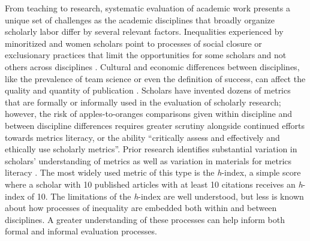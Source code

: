 \documentclass[
  10pt,
  letterpaper,
]{article}
\begin{document}
From teaching to research, systematic evaluation of academic work
presents a unique set of challenges as the academic disciplines that
broadly organize scholarly labor differ by several relevant factors.
Inequalities experienced by minoritized and women scholars point to
processes of social closure or exclusionary practices that limit the
opportunities for some scholars and not others across disciplines
\citep{hofstra_diversity_2020, lariviere_bibliometrics_2013, xie_sex_1998}.
Cultural and economic differences between disciplines, like the
prevalence of team science or even the definition of success, can affect
the quality and quantity of publication
\citep{fortunato_science_2018, gardner_conceptualizing_2009, stephan_how_2012}.
Scholars have invented dozens of metrics that are formally or informally
used in the evaluation of scholarly research; however, the risk of
apples-to-oranges comparisons given within discipline and between
discipline differences requires greater scrutiny
\citep{hicks_bibliometrics_2015, ioannidis_standardized_2019} alongside
continued efforts towards metrics literacy, or the ability ``critically
assess and effectively and ethically use scholarly
metrics''\citep{maggio_becoming_2022}. Prior research identifies
substantial variation in scholars' understanding of metrics
\citep{hammarfelt_conflicting_2018, kamrani_researchers_2021, rousseau_becoming_2018}
as well as variation in materials for metrics literacy
\citep{maggio_becoming_2022}. The most widely used metric of this type
is the \emph{h}-index, a simple score where a scholar with 10 published
articles with at least 10 citations receives an \emph{h}-index of 10.
The limitations of the \emph{h}-index are well understood, but less is
known about how processes of inequality are embedded both within and
between disciplines. A greater understanding of these processes can help
inform both formal and informal evaluation processes.
\end{document}

